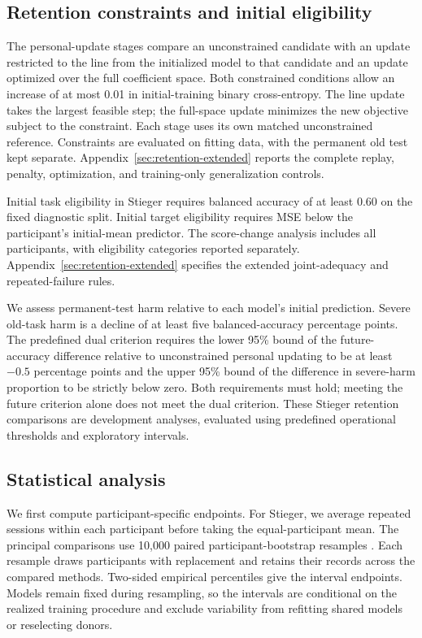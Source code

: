 \documentclass[11pt,a4paper]{article}
\begin{document}
\subsection{Retention constraints and initial eligibility}

The personal-update stages compare an unconstrained candidate with an update restricted to the line from the initialized model to that candidate and an update optimized over the full coefficient space. Both constrained conditions allow an increase of at most 0.01 in initial-training binary cross-entropy. The line update takes the largest feasible step; the full-space update minimizes the new objective subject to the constraint. Each stage uses its own matched unconstrained reference. Constraints are evaluated on fitting data, with the permanent old test kept separate. Appendix~\ref{sec:retention-extended} reports the complete replay, penalty, optimization, and training-only generalization controls.

Initial task eligibility in Stieger requires balanced accuracy of at least 0.60 on the fixed diagnostic split. Initial target eligibility requires MSE below the participant's initial-mean predictor. The score-change analysis includes all participants, with eligibility categories reported separately. Appendix~\ref{sec:retention-extended} specifies the extended joint-adequacy and repeated-failure rules.

We assess permanent-test harm relative to each model's initial prediction. Severe old-task harm is a decline of at least five balanced-accuracy percentage points. The predefined dual criterion requires the lower 95\% bound of the future-accuracy difference relative to unconstrained personal updating to be at least $-0.5$ percentage points and the upper 95\% bound of the difference in severe-harm proportion to be strictly below zero. Both requirements must hold; meeting the future criterion alone does not meet the dual criterion. These Stieger retention comparisons are development analyses, evaluated using predefined operational thresholds and exploratory intervals.

\subsection{Statistical analysis}

We first compute participant-specific endpoints. For Stieger, we average repeated sessions within each participant before taking the equal-participant mean. The principal comparisons use 10,000 paired participant-bootstrap resamples \cite{efron1979}. Each resample draws participants with replacement and retains their records across the compared methods. Two-sided empirical percentiles give the interval endpoints. Models remain fixed during resampling, so the intervals are conditional on the realized training procedure and exclude variability from refitting shared models or reselecting donors.
\end{document}
